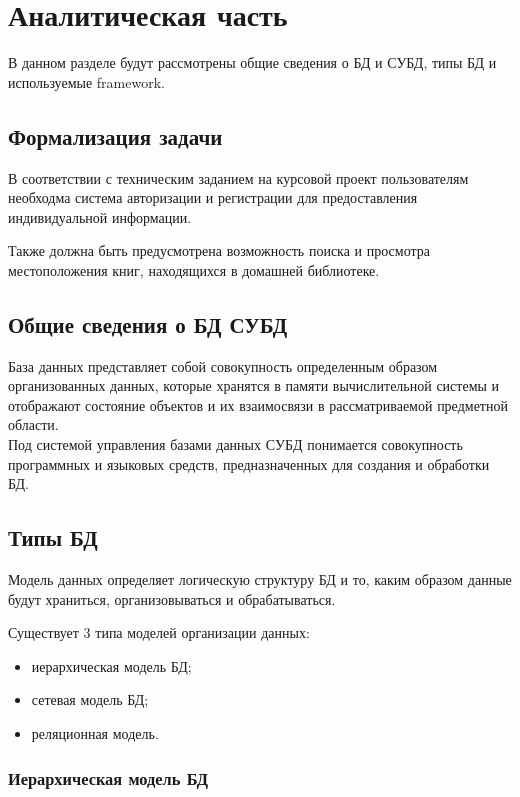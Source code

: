 \newpage
\section{Аналитическая часть}%
\setcounter{section}{1}

В данном разделе будут рассмотрены общие сведения о БД и СУБД, типы БД и используемые framework. 

\subsection{Формализация задачи}%
 \setcounter{subsection}{1}
 
 В соответствии с техническим заданием на курсовой проект пользователям необходма система авторизации и регистрации для предоставления индивидуальной информации.

Также должна быть предусмотрена возможность поиска и просмотра местоположения книг, находящихся в домашней библиотеке.
 


\subsection{Общие сведения о БД  СУБД}%
 \setcounter{subsection}{2}
 База данных представляет собой совокупность определенным образом организованных данных, которые хранятся в памяти вычислительной системы и отображают состояние объектов и их взаимосвязи в рассматриваемой предметной области.\\
Под системой управления базами данных \(СУБД\) понимается совокупность программных и языковых средств, предназначенных для создания и обработки БД. 

\subsection{Типы БД}
 \setcounter{subsection}{3}
 
 Модель данных определяет логическую структуру БД и то, каким образом данные будут храниться, организовываться и обрабатываться. 
 
 Существует 3 типа моделей организации данных:
\begin{itemize}
	\item иерархическая модель БД;
	\item сетевая модель БД;
	\item реляционная модель.
\end{itemize}

\subsubsection{Иерархическая модель БД}
 \setcounter{subsubsection}{1}

